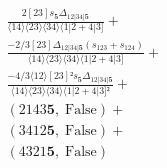 \documentclass[varwidth, border=5pt]{standalone}
\begin{document}
\begin{my}
$\begin{gathered}
\scriptscriptstyle\frac{2[23]s_{𝟓}Δ_{12|34|𝟓}}{⟨14⟩⟨23⟩⟨34⟩⟨1|2+4|3]} +\\
\scriptscriptstyle\frac{-2/3[23]Δ_{12|34|𝟓}(s_{123}+s_{124})}{⟨14⟩⟨23⟩⟨34⟩⟨1|2+4|3]} +\\
\scriptscriptstyle\frac{-4/3⟨12⟩[23]²s_{𝟓}Δ_{12|34|𝟓}}{⟨14⟩⟨23⟩⟨34⟩⟨1|2+4|3]²} +\\
\scriptscriptstyle(2143𝟓,\;\text{False}) +\\
\scriptscriptstyle(3412𝟓,\;\text{False}) +\\
\scriptscriptstyle(4321𝟓,\;\text{False}) \phantom{+}
\end{gathered}$
\end{my}
\end{document}
